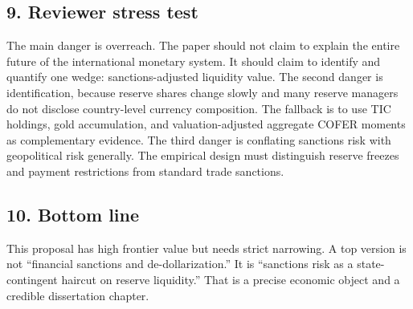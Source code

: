 \documentclass[11pt]{article}
\begin{document}
\subsection*{9. Reviewer stress test}
The main danger is overreach. The paper should not claim to explain the entire future of the international monetary system. It should claim to identify and quantify one wedge: sanctions-adjusted liquidity value. The second danger is identification, because reserve shares change slowly and many reserve managers do not disclose country-level currency composition. The fallback is to use TIC holdings, gold accumulation, and valuation-adjusted aggregate COFER moments as complementary evidence. The third danger is conflating sanctions risk with geopolitical risk generally. The empirical design must distinguish reserve freezes and payment restrictions from standard trade sanctions.

\subsection*{10. Bottom line}
This proposal has high frontier value but needs strict narrowing. A top version is not ``financial sanctions and de-dollarization.'' It is ``sanctions risk as a state-contingent haircut on reserve liquidity.'' That is a precise economic object and a credible dissertation chapter.


\newpage
\printbibliography
\end{document}
